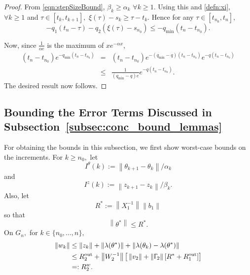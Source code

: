 \documentclass[usenames,dvipsnames,final,12pt]{colt2018} %
\newcommand{\bt}{b_1}
\newcommand{\Xt}{X_1}
\newcommand{\st}{\alpha}
\newcommand{\lt}{q_1}
\newcommand{\Rto}{R_1^\textrm{out}}
\newcommand{\thS}{\theta^*}
\newcommand{\vw}{v_2}
\newcommand{\Tw}{\Upgamma_2}
\newcommand{\Ww}{W_2}
\newcommand{\sw}{\beta}
\newcommand{\lz}{q_2}
\newcommand{\Rwo}{R_2^w}
\newcommand{\Rzo}{R_2^{\textrm{out}}}
\newcommand{\lmin}{q_{\min}}
\newcommand{\lm}{q}
\newcommand{\tI}[1]{t_{#1}}
\newcommand{\sI}[1]{s_{#1}}
\newcommand{\norm}[1]{\left\lVert#1\right\rVert}
\newcommand{\Rs}{R^*}
\newcommand{\It}{I^\theta}
\newcommand{\Iz}{I^z}
\newcommand{\gal}[1]{#1}
\begin{document}
\begin{proof}
	From \eqref{eqn:stepSizeBound}, $\beta_k \geq \alpha_k$ $\forall k \geq 1.$ Using this and  \eqref{defn:xi}, $\forall k \geq 1$ and $\tau \in [\tI{k}, \tI{k + 1}],$ $\xi(\tau) - \sI{k} \geq \tau - \tI{k}.$ Hence for any $\tau \in [\tI{n_0}, \tI{n}],$
	\[
	-\lt(\tI{n} - \tau) - \lz(\xi(\tau) - \sI{n_0}) \leq -\lmin(\tI{n} - \tI{n_0}).
	\]
	
	Now, since $\frac{1}{\alpha e}$ is the maximum of $xe^{-\alpha x}$,
	\begin{eqnarray*}
		(\tI{n} - \tI{n_0})e^{-\lmin(\tI{n} - \tI{n_0})}
		& = &(\tI{n} - \tI{n_0}) e^{-(\lmin-\lm)(\tI{n} - \tI{n_0})} e^{-\lm(\tI{n} - \tI{n_0})}\\
		& \leq &  \frac{1}{(\lmin-\lm)e}e^{-\lm(\tI{n} - \tI{n_0})}.
	\end{eqnarray*}
	The desired result now follows.
\end{proof}

\subsection{\gal{Bounding the Error Terms Discussed in Subsection~\ref{subsec:conc_bound_lemmas}}}
\label{appendix: perturbation bounds}
For obtaining the bounds in this subsection, we first show worst-case bounds on the increments.
For $k \geq n_0,$ let
%
\begin{equation}
\label{defn:Itk}
\It(k) := \norm{\theta_{k + 1} - \theta_k} / \st_k
\end{equation}
%
and
%
\begin{equation}
\label{defn:Izk}
\Iz(k) := \norm{z_{k + 1} - z_k} / \sw_k.
\end{equation}
Also, \gal{let}
\begin{equation}
\label{eq:R-star defn}
\Rs := \norm{\Xt^{-1}} \norm{\bt}
\end{equation}
so that
%
\begin{equation}
\label{eqn:thsBd}
\norm{\thS} \leq  \Rs.
\end{equation}
%
On $G_n,$ for $k \in \{n_0, \ldots, n\},$
%
\begin{align}
	\norm{w_k}   & \leq  \norm{z_k} +  \norm{\lambda(\thS)} + \norm{\lambda(\theta_k) - \lambda(\thS)} \nonumber
	\\
	& \leq  \Rzo + \norm{\Ww^{-1}} \big[\norm{\vw} + \norm{\Tw}[\Rs + \Rto] \big] \nonumber \\
	& =:  \Rwo. \label{eqn:wBd}
\end{align}
\end{document}
